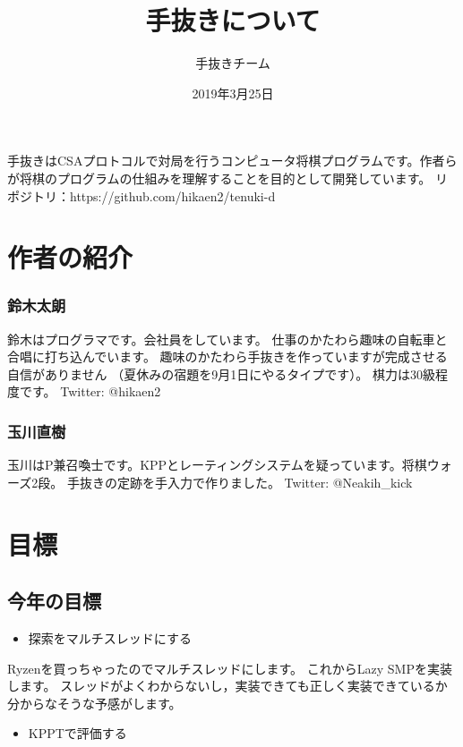 \documentclass[a4paper]{ltjsarticle}
\title{手抜きについて}
\author{手抜きチーム}
\date{2019年3月25日}
\begin{document}
\maketitle

手抜きはCSAプロトコルで対局を行うコンピュータ将棋プログラムです。作者らが将棋のプログラムの仕組みを理解することを目的として開発しています。
リポジトリ：https://github.com/hikaen2/tenuki-d



\section{作者の紹介}

\subsubsection*{鈴木太朗}
鈴木はプログラマです。会社員をしています。
仕事のかたわら趣味の自転車と合唱に打ち込んでいます。
趣味のかたわら手抜きを作っていますが完成させる自信がありません
（夏休みの宿題を9月1日にやるタイプです）。
棋力は30級程度です。
Twitter: @hikaen2

\subsubsection*{玉川直樹}
玉川はP兼召喚士です。KPPとレーティングシステムを疑っています。将棋ウォーズ2段。
手抜きの定跡を手入力で作りました。
Twitter: @Neakih\_kick


\section{目標}

\subsection{今年の目標}

\begin{itemize}
\item 探索をマルチスレッドにする
\end{itemize}

Ryzenを買っちゃったのでマルチスレッドにします。
これからLazy SMPを実装します。
スレッドがよくわからないし，実装できても正しく実装できているか分からなそうな予感がします。

\begin{itemize}
\item KPPTで評価する
\end{itemize}
\end{document}
